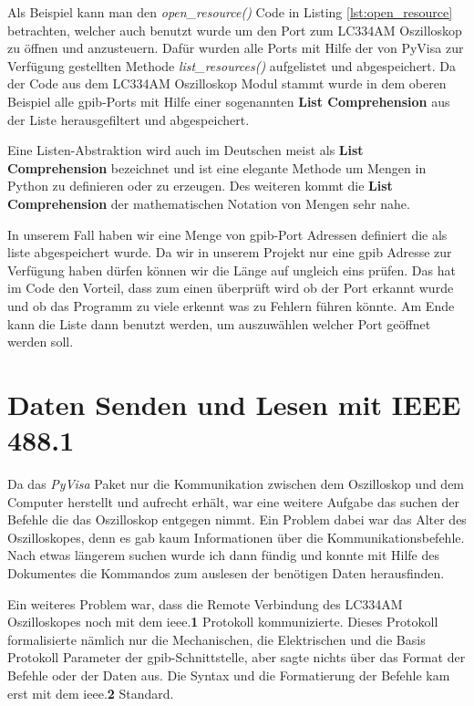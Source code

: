 
Als Beispiel kann man den \textit{open\_resource()} Code in Listing \ref{lst:open_resource} 
betrachten, welcher auch benutzt wurde um den Port zum LC334AM Oszilloskop zu öffnen und 
anzusteuern. Dafür wurden alle Ports mit Hilfe der von PyVisa zur Verfügung gestellten Methode 
\textit{list\_resources()} aufgelistet und abgespeichert. 
Da der Code aus dem LC334AM Oszilloskop Modul stammt wurde in dem oberen Beispiel alle 
\ac{gpib}-Ports mit Hilfe einer sogenannten \textbf{List Comprehension} aus der Liste 
herausgefiltert und abgespeichert. 

Eine Listen-Abstraktion wird auch im Deutschen meist als \textbf{List Comprehension} bezeichnet 
und ist eine elegante Methode um Mengen in Python zu definieren oder zu erzeugen. Des weiteren 
kommt die \textbf{List Comprehension} der mathematischen Notation von Mengen sehr nahe. 

In unserem Fall haben wir eine Menge von \ac{gpib}-Port Adressen definiert die als liste 
abgespeichert wurde. Da wir in unserem Projekt nur eine \ac{gpib} Adresse zur Verfügung haben 
dürfen können wir die Länge auf ungleich eins prüfen. Das hat im Code den Vorteil, dass zum 
einen überprüft wird ob der Port erkannt wurde und ob das Programm zu viele erkennt was zu 
Fehlern führen könnte. Am Ende kann die Liste dann benutzt werden, um auszuwählen welcher Port 
geöffnet werden soll. 

\section{Daten Senden und Lesen mit IEEE 488.1}
\label{sec:send_receive}

Da das \textit{PyVisa} Paket nur die Kommunikation zwischen dem Oszilloskop und dem Computer herstellt und aufrecht erhält, war eine weitere Aufgabe das suchen der Befehle die das Oszilloskop entgegen nimmt. Ein Problem dabei war das Alter des Oszilloskopes, denn es gab kaum Informationen über die Kommunikationsbefehle. Nach etwas längerem suchen wurde ich dann fündig und konnte mit Hilfe des Dokumentes  die Kommandos zum auslesen der benötigen Daten herausfinden. 

Ein weiteres Problem war, dass die Remote Verbindung des LC334AM Oszilloskopes noch mit dem \ac{ieee}.\textbf{1} Protokoll kommunizierte. Dieses Protokoll formalisierte nämlich nur die Mechanischen, die Elektrischen und die Basis Protokoll Parameter der \ac{gpib}-Schnittstelle, aber sagte nichts über das Format der Befehle oder der Daten aus. Die Syntax und die Formatierung der Befehle kam erst mit dem \ac{ieee}.\textbf{2} Standard.